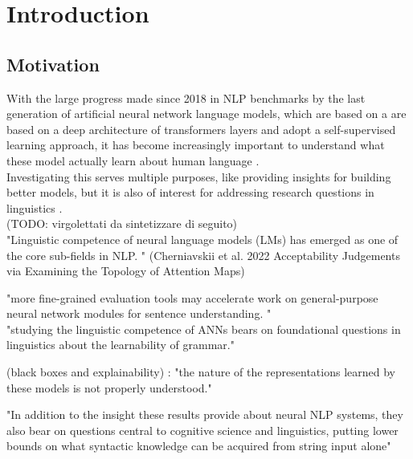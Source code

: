 
\chapter{Introduction}


\section{Motivation}

With the large progress made since 2018 in NLP benchmarks by the last generation of artificial neural network language models, which are based on a  are based on a deep architecture of transformers layers and adopt a self-supervised learning approach, it has become increasingly important to understand what these model actually learn about human language \citep{hewitt2019structural, manning2020emergent, trotta2021monolingual}. \\
Investigating this serves multiple purposes, like providing insights for building better models, but it is also of interest for addressing research questions in linguistics \citep{hewitt2019structural}.  \\

(TODO: virgolettati da sintetizzare di seguito) \\

"Linguistic competence of neural language models (LMs) has emerged as one of the core sub-fields in NLP. "  (Cherniavskii et al. 2022 Acceptability Judgements via Examining the Topology of Attention Maps)

"more fine-grained evaluation tools may accelerate work on general-purpose neural network modules for sentence understanding. " \\
"studying the linguistic competence of ANNs bears on foundational questions in linguistics about the learnability of grammar."

(black boxes and explainability) : "the nature of the representations learned by these models is not properly understood." \citep{wilcox2018rnn}

"In addition to the insight these results provide about neural NLP systems, they also bear on questions central to cognitive science and linguistics, putting lower bounds on what syntactic knowledge can be acquired from string input alone"  \citep{hu2020systematic} 



